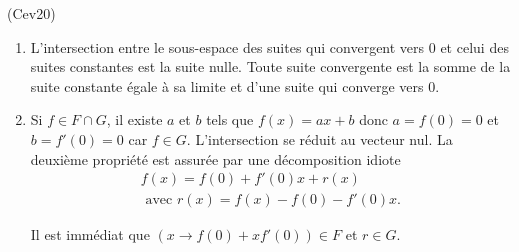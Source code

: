 \begin{tiny}(Cev20)\end{tiny}
\begin{enumerate}
 \item L'intersection entre le sous-espace des suites qui convergent vers $0$ et celui des suites constantes est la suite nulle. Toute suite convergente est la somme de la suite constante égale à sa limite et d'une suite qui converge vers $0$.
 \item Si $f\in F \cap G$, il existe $a$ et $b$ tels que $f(x) = ax + b$ donc $a=f(0)=0$ et $b=f'(0)=0$ car $f\in G$. L'intersection se réduit au vecteur nul. La deuxième propriété est assurée par une décomposition idiote
\begin{multline*}
 f(x) = f(0) + f'(0)x + r(x) \\ 
 \text{ avec } r(x) = f(x) -f(0) - f'(0)x.
\end{multline*}

Il est immédiat que $\left( x\rightarrow f(0) + xf'(0)\right)\in F$ et $r\in G$. 
\end{enumerate}
